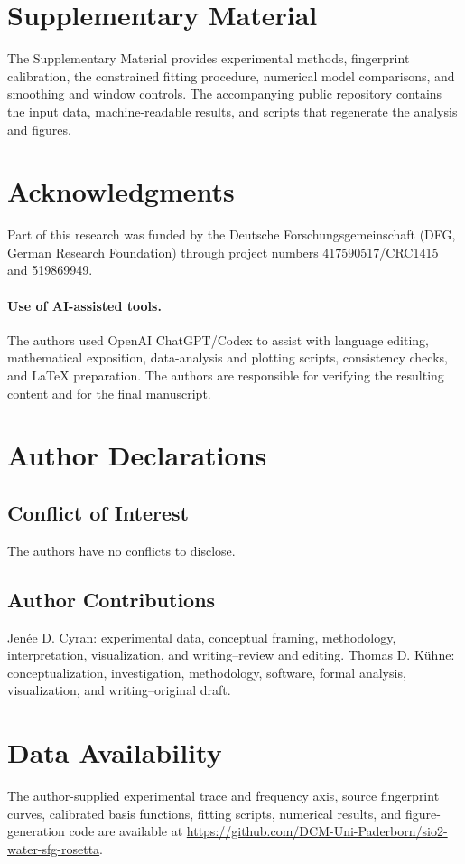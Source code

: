 \documentclass[aip,jcp,reprint,amsmath,amssymb]{revtex4-2}
\begin{document}
\section*{Supplementary Material}

The Supplementary Material provides experimental methods, fingerprint calibration, the constrained fitting procedure, numerical model comparisons, and smoothing and window controls. The accompanying public repository contains the input data, machine-readable results, and scripts that regenerate the analysis and figures.

\section*{Acknowledgments}

Part of this research was funded by the Deutsche Forschungsgemeinschaft (DFG, German Research Foundation) through project numbers 417590517/CRC1415 and 519869949.

\paragraph*{Use of AI-assisted tools.}
The authors used OpenAI ChatGPT/Codex to assist with language editing, mathematical exposition, data-analysis and plotting scripts, consistency checks, and LaTeX preparation. The authors are responsible for verifying the resulting content and for the final manuscript.

\section*{Author Declarations}

\subsection*{Conflict of Interest}
The authors have no conflicts to disclose.

\subsection*{Author Contributions}
Jen{\'e}e D. Cyran: experimental data, conceptual framing, methodology, interpretation, visualization, and writing--review and editing. Thomas D. K{\"u}hne: conceptualization, investigation, methodology, software, formal analysis, visualization, and writing--original draft.

\section*{Data Availability}

The author-supplied experimental trace and frequency axis, source fingerprint curves, calibrated basis functions, fitting scripts, numerical results, and figure-generation code are available at \url{https://github.com/DCM-Uni-Paderborn/sio2-water-sfg-rosetta}.



\end{document}
